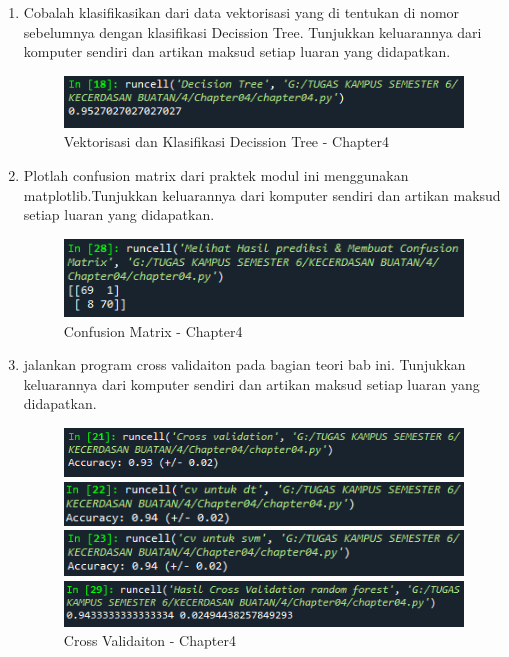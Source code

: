 \begin{enumerate}
	\item Cobalah klasifikasikan dari data vektorisasi yang di tentukan di nomor sebelumnya dengan klasifikasi Decission Tree. Tunjukkan keluarannya dari komputer sendiri dan artikan maksud setiap luaran yang didapatkan.
	      \begin{figure}[ht]
		      \centerline{\includegraphics[scale=0.7]{figures/chappter4-5.png}}
		      \caption{Vektorisasi dan Klasifikasi Decission Tree - Chapter4}
		      \label{Vektorisasi dan Klasifikasi Decission Tree - Chapter4}
	      \end{figure}

	\item Plotlah confusion matrix dari praktek modul ini menggunakan matplotlib.Tunjukkan keluarannya dari komputer sendiri dan artikan maksud setiap luaran yang didapatkan.
	      \begin{figure}[ht]
		      \centerline{\includegraphics[scale=0.7]{figures/chappter4-6.png}}
		      \caption{Confusion Matrix - Chapter4}
		      \label{Confusion Matrix - Chapter4}
	      \end{figure}

	\item jalankan program cross validaiton pada bagian teori bab ini. Tunjukkan keluarannya dari komputer sendiri dan artikan maksud setiap luaran yang didapatkan.
	\newpage
	\begin{figure}[ht]
		\centerline{\includegraphics[scale=0.7]{figures/chappter4-7.png}}
		\centerline{\includegraphics[scale=0.7]{figures/chappter4-7a.png}}
		\centerline{\includegraphics[scale=0.7]{figures/chappter4-7b.png}}
		\centerline{\includegraphics[scale=0.7]{figures/chappter4-7c.png}}
		\caption{Cross Validaiton - Chapter4}
		\label{Cross Validaiton - Chapter4}
	\end{figure}


\end{enumerate}
